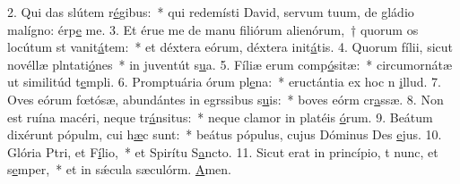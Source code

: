 2. Qui das slútem r\uline{é}gibus:~* qui redemísti David, servum tuum, de gládio malígno: érp\uline{e} me.
3. Et érue me de manu filiórum alienórum,~† quorum os locútum st vanit\uline{á}tem:~* et déxtera eórum, déxtera init\uline{á}tis.
4. Quorum fílii, sicut novéllæ plntati\uline{ó}nes~* in juventút s\uline{u}a.
5. Fíliæ erum comp\uline{ó}sitæ:~* circumornátæ ut similitúd t\uline{e}mpli.
6. Promptuária órum pl\uline{e}na:~* eructántia ex hoc n \uline{i}llud.
7. Oves eórum fœtósæ, abundántes in egrssibus s\uline{u}is:~* boves eórm cr\uline{a}ssæ.
8. Non est ruína macéri, neque tr\uline{á}nsitus:~* neque clamor in platéis \uline{ó}rum.
9. Beátum dixérunt pópulm, cui h\uline{æ}c sunt:~* beátus pópulus, cujus Dóminus Des \uline{e}jus.
10. Glória Ptri, et F\uline{í}lio,~* et Spirítu S\uline{a}ncto.
11. Sicut erat in princípio, t nunc, et s\uline{e}mper,~* et in sǽcula sæculórm. \uline{A}men.
